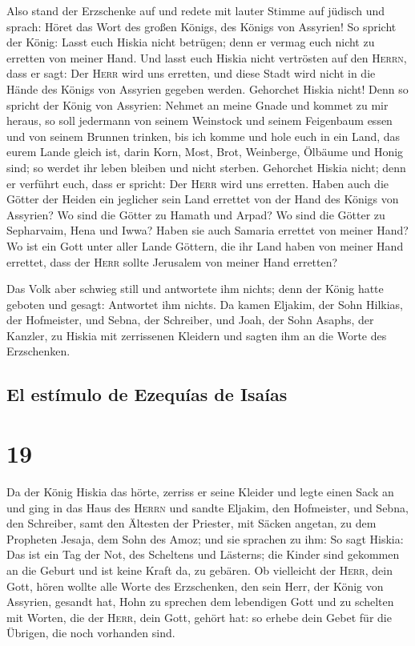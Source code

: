  Also stand der Erzschenke auf und redete mit lauter
Stimme auf jüdisch und sprach: Höret das Wort des großen Königs, des
Königs von Assyrien!  So spricht der König: Lasst euch
Hiskia nicht betrügen; denn er vermag euch nicht zu erretten von meiner
Hand.  Und lasst euch Hiskia nicht vertrösten auf den
\textsc{Herrn}, dass er sagt: Der \textsc{Herr} wird uns erretten, und
diese Stadt wird nicht in die Hände des Königs von Assyrien gegeben
werden.  Gehorchet Hiskia nicht! Denn so spricht der
König von Assyrien: Nehmet an meine Gnade und kommet zu mir heraus, so
soll jedermann von seinem Weinstock und seinem Feigenbaum essen und von
seinem Brunnen trinken,  bis ich komme und hole euch in
ein Land, das eurem Lande gleich ist, darin Korn, Most, Brot, Weinberge,
Ölbäume und Honig sind; so werdet ihr leben bleiben und nicht sterben.
Gehorchet Hiskia nicht; denn er verführt euch, dass er spricht: Der
\textsc{Herr} wird uns erretten.  Haben auch die Götter
der Heiden ein jeglicher sein Land errettet von der Hand des Königs von
Assyrien?  Wo sind die Götter zu Hamath und Arpad? Wo
sind die Götter zu Sepharvaim, Hena und Iwwa? Haben sie auch Samaria
errettet von meiner Hand?  Wo ist ein Gott unter aller
Lande Göttern, die ihr Land haben von meiner Hand errettet, dass der
\textsc{Herr} sollte Jerusalem von meiner Hand erretten?

 Das Volk aber schwieg still und antwortete ihm nichts;
denn der König hatte geboten und gesagt: Antwortet ihm nichts.
 Da kamen Eljakim, der Sohn Hilkias, der Hofmeister, und
Sebna, der Schreiber, und Joah, der Sohn Asaphs, der Kanzler, zu Hiskia
mit zerrissenen Kleidern und sagten ihm an die Worte des Erzschenken.

\hypertarget{el-estuxedmulo-de-ezequuxedas-de-isauxedas}{%
\subsection{El estímulo de Ezequías de
Isaías}\label{el-estuxedmulo-de-ezequuxedas-de-isauxedas}}

\hypertarget{section-18}{%
\section{19}\label{section-18}}

 Da der König Hiskia das hörte, zerriss er seine Kleider
und legte einen Sack an und ging in das Haus des \textsc{Herrn}
 und sandte Eljakim, den Hofmeister, und Sebna, den
Schreiber, samt den Ältesten der Priester, mit Säcken angetan, zu dem
Propheten Jesaja, dem Sohn des Amoz;  und sie sprachen zu
ihm: So sagt Hiskia: Das ist ein Tag der Not, des Scheltens und
Lästerns; die Kinder sind gekommen an die Geburt und ist keine Kraft da,
zu gebären.  Ob vielleicht der \textsc{Herr}, dein Gott,
hören wollte alle Worte des Erzschenken, den sein Herr, der König von
Assyrien, gesandt hat, Hohn zu sprechen dem lebendigen Gott und zu
schelten mit Worten, die der \textsc{Herr}, dein Gott, gehört hat: so
erhebe dein Gebet für die Übrigen, die noch vorhanden sind.

